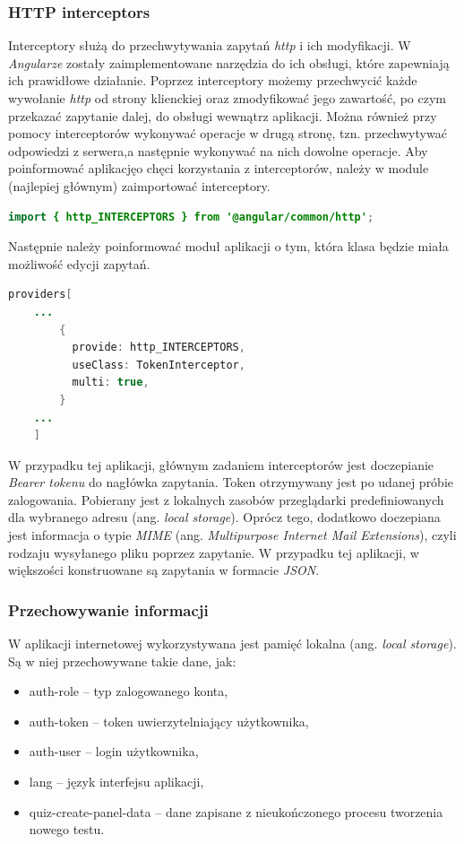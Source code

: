 \documentclass[twoside]{projektInzynierskiMS}
\numberwithin{figure}{section}
\begin{document}
\subsubsection{HTTP interceptors}
Interceptory służą do przechwytywania zapytań \textit{http} i ich modyfikacji. W \textit{Angularze} zostały zaimplementowane narzędzia do ich obsługi, które zapewniają ich prawidłowe działanie. Poprzez interceptory możemy przechwycić każde wywołanie \textit{http} od strony klienckiej oraz zmodyfikować jego zawartość, po czym przekazać zapytanie dalej, do obsługi wewnątrz aplikacji. Można również przy pomocy interceptorów wykonywać operacje w drugą stronę, tzn. przechwytywać odpowiedzi z serwera,\linebreak a następnie wykonywać na nich dowolne operacje.
Aby poinformować aplikację\linebreak o chęci korzystania z interceptorów, należy w module (najlepiej głównym) zaimportować interceptory.
\begin{lstlisting}[language=Java,caption=Przykład importowania interceptorów. Źródło: Opracowanie własne.,captionpos=b]
    import { http_INTERCEPTORS } from '@angular/common/http';
\end{lstlisting}
Następnie należy poinformować moduł aplikacji o tym, która klasa będzie miała możliwość edycji zapytań.
\begin{lstlisting}[language=Java,caption=Poinformowanie aplikacji o możliwości edycji zapytań. Źródło: Opracowanie własne.,captionpos=b]
    providers[
    ...
        {
          provide: http_INTERCEPTORS,
          useClass: TokenInterceptor,
          multi: true,
        }
    ...
    ]
\end{lstlisting}
W przypadku tej aplikacji, głównym zadaniem interceptorów jest doczepianie \textit{Bearer tokenu} do nagłówka zapytania. Token otrzymywany jest po udanej próbie zalogowania. Pobierany jest z lokalnych zasobów przeglądarki predefiniowanych dla wybranego adresu (ang. \textit{local storage}). Oprócz tego, dodatkowo doczepiana jest informacja o typie \textit{MIME} (ang. \textit{Multipurpose Internet Mail Extensions}), czyli rodzaju wysyłanego pliku poprzez zapytanie. W przypadku tej aplikacji, w większości konstruowane są zapytania w formacie \textit{JSON}.\newline

\subsubsection{Przechowywanie informacji}
W aplikacji internetowej wykorzystywana jest pamięć lokalna (ang. \textit{local storage}). Są w niej przechowywane takie dane, jak:
\begin{itemize}
    \item auth-role -- typ zalogowanego konta,
    \item auth-token -- token uwierzytelniający użytkownika,
    \item auth-user -- login użytkownika,
    \item lang -- język interfejsu aplikacji,
    \item quiz-create-panel-data -- dane zapisane z nieukończonego procesu tworzenia nowego testu.
\end{itemize}
\end{document}
